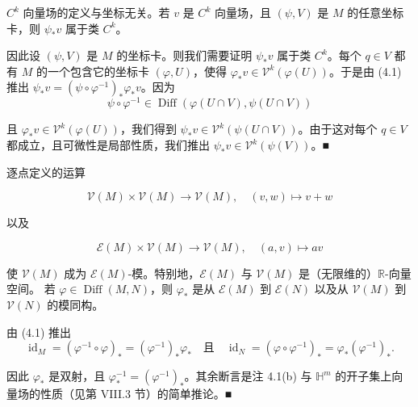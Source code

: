 \begin{remark}

\begin{items}
\item

$ C^{k} $ 向量场的定义与坐标无关。若 $ v $ 是 $ C^{k} $ 向量场，且 $ (\psi,V) $ 是 $ M $ 的任意坐标卡，则 $ \psi_{*}v $ 属于类 $ C^{k} $。

\proofhead
因此设 $ (\psi,V) $ 是 $ M $ 的坐标卡。则我们需要证明 $ \psi_{*}v $ 属于类 $ C^{k} $。每个 $ q \in V $ 都有 $ M $ 的一个包含它的坐标卡 $ (\varphi,U) $，使得 $ \varphi_{*}v \in \mathcal{V}^{k}(\varphi(U)) $。于是由 (4.1) 推出 $ \psi_{*}v = (\psi \circ \varphi^{-1})_{*}\varphi_{*}v $。因为
\[
\psi \circ \varphi^{-1} \in \operatorname{Diff}(\varphi(U \cap V), \psi(U \cap V))
\]

且 $ \varphi_{*}v \in \mathcal{V}^{k}(\varphi(U)) $，我们得到 $ \psi_{*}v \in \mathcal{V}^{k}(\psi(U \cap V)) $。由于这对每个 $ q \in V $ 都成立，且可微性是局部性质，我们推出 $ \psi_{*}v \in \mathcal{V}^{k}(\psi(V)) $。\nobreak\hspace{0.35em}■

\item

逐点定义的运算

\[
\mathcal{V}(M) \times \mathcal{V}(M) \to \mathcal{V}(M) , \quad (v,w) \mapsto v + w
\]

以及

\[
\mathcal{E}(M) \times \mathcal{V}(M) \to \mathcal{V}(M) , \quad (a,v) \mapsto av
\]

使 $ \mathcal{V}(M) $ 成为 $ \mathcal{E}(M) $-模。特别地，$ \mathcal{E}(M) $ 与 $ \mathcal{V}(M) $ 是（无限维的）$ \mathbb{R} $-向量空间。
若 $ \varphi \in \operatorname{Diff}(M,N) $，则 $ \varphi_{*} $ 是从 $ \mathcal{E}(M) $ 到 $ \mathcal{E}(N) $ 以及从 $ \mathcal{V}(M) $ 到 $ \mathcal{V}(N) $ 的模同构。

\proofhead
由 (4.1) 推出
\[
\operatorname{id}_{M} = (\varphi^{-1} \circ \varphi)_{*} = (\varphi^{-1})_{*}\varphi_{*} \quad \text{且} \quad \operatorname{id}_{N} = (\varphi \circ \varphi^{-1})_{*} = \varphi_{*}(\varphi^{-1})_{*} .
\]

因此 $ \varphi_{*} $ 是双射，且 $ \varphi_{*}^{-1} = (\varphi^{-1})_{*} $。其余断言是注 4.1(b) 与 $ \mathbb{H}^{m} $ 的开子集上向量场的性质（见第 VIII.3 节）的简单推论。\nobreak\hspace{0.35em}■

\item


\end{items}
\end{remark}
